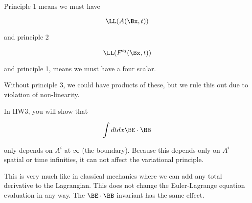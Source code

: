 Principle 1 means we must have 

\begin{equation}\label{eqn:relativisticElectrodynamicsL12b:230}
\LL(A(\Bx, t))
\end{equation}

and principle 2

\begin{equation}\label{eqn:relativisticElectrodynamicsL12b:250}
\LL(F^{ij}(\Bx, t))
\end{equation}

and principle 1, means we must have a four scalar.

Without principle 3, we could have products of these, but we rule this out due to violation of non-linearity.


In HW3, you will show that 

\begin{equation}\label{eqn:relativisticElectrodynamicsL12b:350}
\int dt dx \BE \cdot \BB
\end{equation}

only depends on \(A^i\) at \(\infty\) (the boundary).  Because this depends only on \(A^i\) spatial or time infinities, it can not affect the variational principle.

This is very much like in classical mechanics where we can add any total derivative to the Lagrangian.  This does not change the Euler-Lagrange equation evaluation in any way.  The \(\BE \cdot \BB\) invariant has the same effect.


